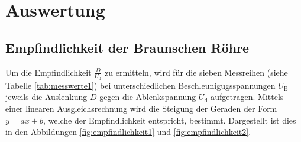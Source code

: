 \section{Auswertung}
\label{sec:Auswertung}

\subsection{Empfindlichkeit der Braunschen Röhre}
Um die Empfindlichkeit $\frac{D}{U_\mathrm{d}}$ zu ermitteln, wird für die sieben Messreihen (siehe Tabelle \ref{tab:messwerte1}) bei unterschiedlichen Beschleunigugsspannungen $U_\mathrm{B}$ jeweils die Auslenkung $D$ gegen die Ablenkspannung $U_\mathrm{d}$ aufgetragen. Mittels einer linearen Ausgleichsrechnung wird die Steigung der Geraden der Form $y=ax+b$, welche der Empfindlichkeit entspricht, bestimmt. Dargestellt ist dies in den Abbildungen \ref{fig:empfindlichkeit1} und \ref{fig:empfindlichkeit2}.

